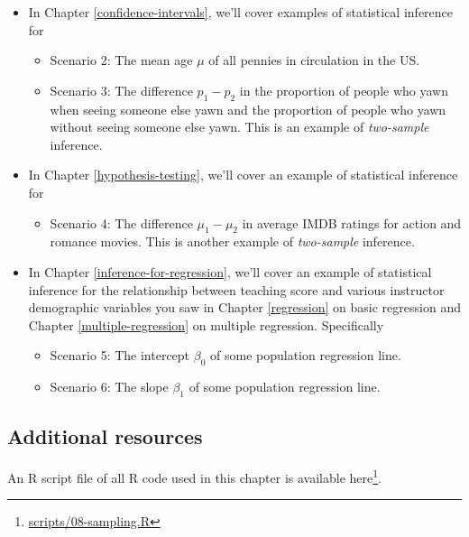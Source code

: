 \documentclass[12pt, krantz2,]{krantz}
\providecommand{\tightlist}{%
  \setlength{\itemsep}{0pt}\setlength{\parskip}{0pt}}
\renewcommand{\href}[2]{#2\footnote{\url{#1}}}
\begin{document}
\begin{itemize}
\tightlist
\item
  In Chapter \ref{confidence-intervals}, we'll cover examples of statistical inference for

  \begin{itemize}
  \tightlist
  \item
    Scenario 2: The mean age \(\mu\) of all pennies in circulation in the US.
  \item
    Scenario 3: The difference \(p_1 - p_2\) in the proportion of people who yawn when seeing someone else yawn and the proportion of people who yawn without seeing someone else yawn. This is an example of \emph{two-sample} inference.
  \end{itemize}
\item
  In Chapter \ref{hypothesis-testing}, we'll cover an example of statistical inference for

  \begin{itemize}
  \tightlist
  \item
    Scenario 4: The difference \(\mu_1 - \mu_2\) in average IMDB ratings for action and romance movies. This is another example of \emph{two-sample} inference.
  \end{itemize}
\item
  In Chapter \ref{inference-for-regression}, we'll cover an example of statistical inference for the relationship between teaching score and various instructor demographic variables you saw in Chapter \ref{regression} on basic regression and Chapter \ref{multiple-regression} on multiple regression. Specifically

  \begin{itemize}
  \tightlist
  \item
    Scenario 5: The intercept \(\beta_0\) of some population regression line.
  \item
    Scenario 6: The slope \(\beta_1\) of some population regression line.
  \end{itemize}
\end{itemize}

\hypertarget{additional-resources-5}{%
\subsection{Additional resources}\label{additional-resources-5}}

An R script file of all R code used in this chapter is available \href{scripts/08-sampling.R}{here}.
\end{document}

